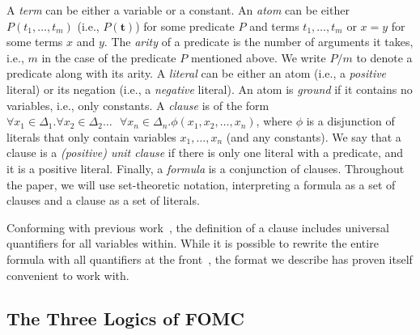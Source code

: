 \documentclass[a4paper,UKenglish,cleveref, autoref, thm-restate]{lipics-v2021}
\begin{document}
A \emph{term} can be either a variable or a constant. An \emph{atom} can be
either $P(t_{1}, \dots, t_{m})$ (i.e., $P(\mathbf{t})$) for some predicate $P$
and terms $t_{1}, \dots, t_{m}$ or $x=y$ for some terms $x$ and $y$. The
\emph{arity} of a predicate is the number of arguments it takes, i.e., $m$ in
the case of the predicate $P$ mentioned above. We write $P/m$ to denote a
predicate along with its arity. A \emph{literal} can be either an atom (i.e., a
\emph{positive} literal) or its negation (i.e., a \emph{negative} literal). An
atom is \emph{ground} if it contains no variables, i.e., only constants. A
\emph{clause} is of the form $\forall x_{1} \in \Delta_{1}\text{.
}\forall x_{2} \in \Delta_{2}\dots\text{ }\forall x_{n} \in \Delta_{n}\text{.
}\phi(x_{1}, x_{2}, \dots, x_{n})$, where $\phi$ is a disjunction of literals
that only contain variables $x_{1}, \dots, x_{n}$ (and any constants). We say
that a clause is a \emph{(positive) unit clause} if there is only one literal
with a predicate, and it is a positive literal. Finally, a \emph{formula} is a
conjunction of clauses. Throughout the paper, we will use set-theoretic
notation, interpreting a formula as a set of clauses and a clause as a set of
literals.

\begin{remark*}
  Conforming with previous work~\cite{DBLP:conf/ijcai/BroeckTMDR11}, the
  definition of a clause includes universal quantifiers for all variables
  within. While it is possible to rewrite the entire formula with all
  quantifiers at the front~\cite{hinman2018fundamentals}, the format we describe
  has proven itself convenient to work with.
\end{remark*}

\subsection{The Three Logics of FOMC}\label{sec:threelogics}
\end{document}
